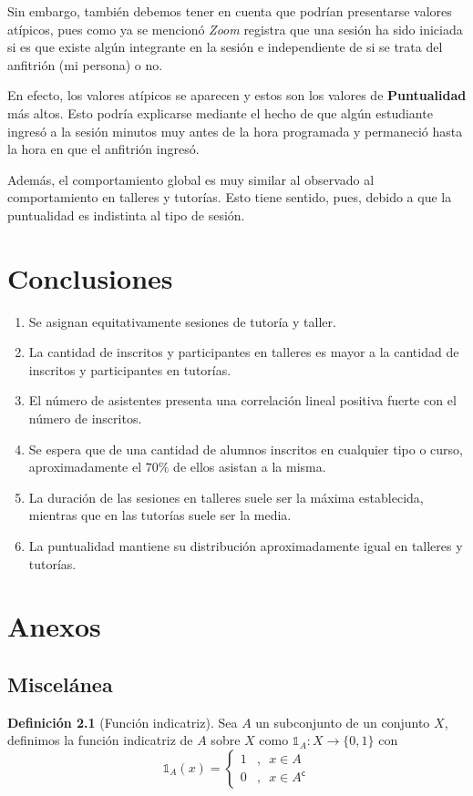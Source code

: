 \documentclass[11pt,a4paper]{book}
\theoremstyle{definition}%
\newtheorem{definicion}[teorema]{Definici\'on}
\newcommand{\setcomplement}{\mathsf{c}}
\begin{document}
            Sin embargo, también debemos tener en cuenta que podrían presentarse valores atípicos, pues como ya se mencionó \textit{Zoom} registra que una sesión ha sido iniciada si es que existe algún integrante en la sesión e independiente de si se trata del anfitrión (mi persona) o no.

            En efecto, los valores atípicos se aparecen y estos son los valores de \textbf{Puntualidad} más altos. Esto podría explicarse mediante el hecho de que algún estudiante ingresó a la sesión minutos muy antes de la hora programada y permaneció hasta la hora en que el anfitrión ingresó.

            Además, el comportamiento global es muy similar al observado al comportamiento en talleres y tutorías. Esto tiene sentido, pues, debido a que la puntualidad es indistinta al tipo de sesión.
    
    \chapter{Conclusiones}
        \begin{enumerate}
            \item Se asignan equitativamente sesiones de tutoría y taller.
            \item La cantidad de inscritos y participantes en talleres es mayor a la cantidad de inscritos y participantes en tutorías.
            \item El número de asistentes presenta una correlación lineal positiva fuerte con el número de inscritos.
            \item Se espera que de una cantidad de alumnos inscritos en cualquier tipo o curso, aproximadamente el $70\%$ de ellos asistan a la misma.
            \item La duración de las sesiones en talleres suele ser la máxima establecida, mientras que en las tutorías suele ser la media.
            \item La puntualidad mantiene su distribución aproximadamente igual en talleres y tutorías.
        \end{enumerate}
    \chapter{Anexos}
        \section{Miscelánea}
            \begin{definicion}[Función indicatriz]
                Sea $A$ un subconjunto de un conjunto $X$, definimos la función indicatriz de $A$ sobre $X$ como $\mathds{1}_A:X\longrightarrow\{0,1\}$ con
                \begin{equation*}
                    \mathds{1}_A (x)=\left\{\begin{array}{cl}
                        1&,\enspace x\in A  \\
                        0&,\enspace x \in A^\setcomplement
                    \end{array}\right.
                \end{equation*}
            \end{definicion}
\end{document}

